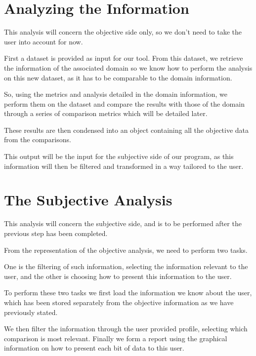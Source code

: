 \section{Analyzing the Information}
\label{cap2:sec:analysis}

This analysis will concern the objective side only, so we don't need to take the user into account for now.

First a dataset is provided as input for our tool. From this dataset, we retrieve the information of the associated domain so we know how to perform the analysis on this new dataset, as it has to be comparable to the domain information.

So, using the metrics and analysis detailed in the domain information, we perform them on the dataset and compare the results with those of the domain through a series of comparison metrics which will be detailed later.

These results are then condensed into an object containing all the objective data from the comparisons.

This output will be the input for the subjective side of our program, as this information will then be filtered and transformed in a way tailored to the user.

\section{The Subjective Analysis}
\label{cap2:sec:subjective}

This analysis will concern the subjective side, and is to be performed after the previous step has been completed.

From the representation of the objective analysis, we need to perform two tasks.

One is the filtering of such information, selecting the information relevant to the user, and the other is choosing how to present this information to the user.

To perform these two tasks we first load the information we know about the user, which has been stored separately from the objective information as we have previously stated.

We then filter the information through the user provided profile, selecting which comparison is most relevant. Finally we form a report using the graphical information on how to present each bit of data to this user.

